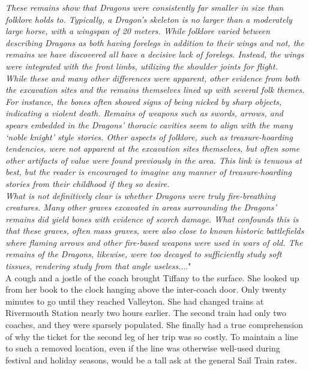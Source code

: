 \textit{These remains show that Dragons were consistently far smaller in size than folklore holds to. Typically, a Dragon's skeleton is no larger than a moderately large horse, with a wingspan of 20 meters. While folklore varied between describing Dragons as both having forelegs in addition to their wings and not, the remains we have discovered all have a decisive lack of forelegs. Instead, the wings were integrated with the front limbs, utilizing the shoulder joints for flight.}\\

\textit{While these and many other differences were apparent, other evidence from both the excavation sites and the remains themselves lined up with several folk themes. For instance, the bones often showed signs of being nicked by sharp objects, indicating a violent death. Remains of weapons such as swords, arrows, and spears embedded in the Dragons' thoracic cavities seem to align with the many `noble knight' style stories. Other aspects of folklore, such as treasure-hoarding tendencies, were not apparent at the excavation sites themselves, but often some other artifacts of value were found previously in the area. This link is tenuous at best, but the reader is encouraged to imagine any manner of treasure-hoarding stories from their childhood if they so desire.}\\

\textit{What is not definitively clear is whether Dragons were truly fire-breathing creatures. Many other graves excavated in areas surrounding the Dragons' remains did yield bones with evidence of scorch damage. What confounds this is that these graves, often mass graves, were also close to known historic battlefields where flaming arrows and other fire-based weapons were used in wars of old. The remains of the Dragons, likewise, were too decayed to sufficiently study soft tissues, rendering study from that angle useless.}..."\\

A cough and a jostle of the coach brought Tiffany to the surface. 
She looked up from her book to the clock hanging above the inter-coach door. 
Only twenty minutes to go until they reached Valleyton. 
She had changed trains at Rivermouth Station nearly two hours earlier. 
The second train had only two coaches, and they were sparsely populated.
She finally had a true comprehension of why the ticket for the second leg of her trip was so costly.
To maintain a line to such a removed location, even if the line was otherwise well-used during festival and holiday seasons, would be a tall ask at the general Sail Train rates.\\

